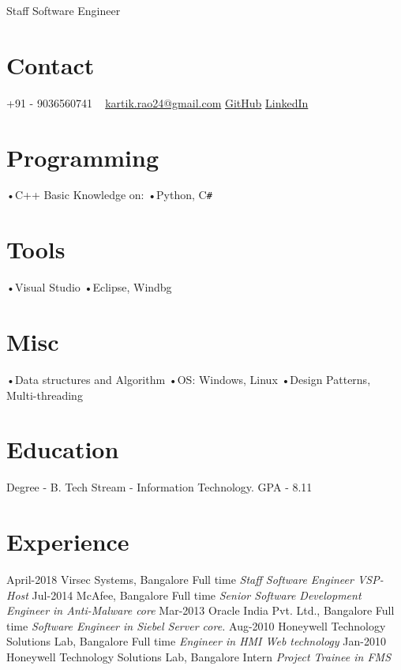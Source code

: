 \documentclass[]{kartikkumar-cv}
\begin{document}
       {Staff Software Engineer}
          
\begin{aside}
  \section{Contact}
    +91 - 9036560741
    ~
    \href{mailto:kartik.rao24@gmail.com}{kartik.rao24@gmail.com}
    \href{https://github.com/raokartikkumar24}{GitHub}
    \href{https://in.linkedin.com/in/raokartikkumar}{LinkedIn}
    ~
  \section{Programming}
   •C++ 
   Basic Knowledge on:
   •Python, C\texttt{\#}
    ~
    \section{Tools}
    •Visual Studio
    •Eclipse, Windbg
    \section{Misc}
   •Data structures and Algorithm
   •OS: Windows, Linux
   •Design Patterns, Multi-threading
~   
  \section{Education}
  	{Degree - B. Tech }
  	{Stream - Information Technology.}
  	{ GPA - 8.11}
~  	
\end{aside}

\section{Experience}

\begin{entrylist}
	\entry
	{April-2018}
	{Virsec Systems, Bangalore}
	{Full time}
	{\emph{Staff Software Engineer VSP-Host}}
  \entry
    {Jul-2014}
    {McAfee, Bangalore}
    {Full time}
    {\emph{Senior Software Development Engineer in Anti-Malware core}}
  \entry
    {Mar-2013}
    {Oracle India Pvt. Ltd., Bangalore}
    {Full time}
    {\emph{Software Engineer in Siebel Server core.}}
  \entry
    {Aug-2010}
    {Honeywell Technology Solutions Lab, Bangalore}
    {Full time}
    {\emph{Engineer in HMI Web technology}}
   \entry
   {Jan-2010}
   {Honeywell Technology Solutions Lab, Bangalore}
   {Intern}
   {\emph{Project Trainee in FMS} }
\end{entrylist}
\end{document}
